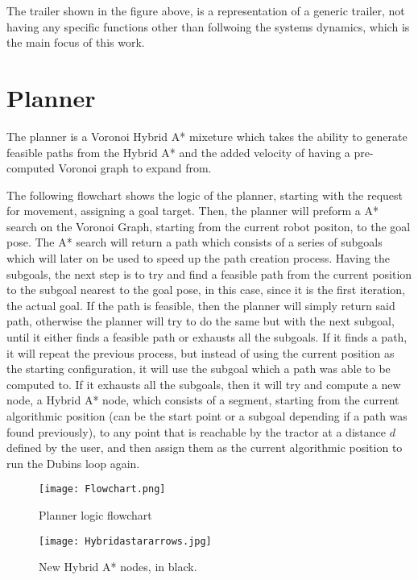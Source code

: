 The trailer shown in the figure above, is a representation of a generic trailer, not having any specific 
functions other than follwoing the systems dynamics, which is the main focus of this work.

\section{Planner}
\label{sec:planner1}
The planner is a Voronoi Hybrid A* mixeture which takes the 
ability to generate feasible paths from the Hybrid A* and the 
added velocity of having a pre-computed Voronoi graph to expand 
from.

The following flowchart shows the logic of the planner, starting with 
the request for movement, assigning a goal target. Then, the planner will 
preform a A* search on the Voronoi Graph, starting from the current robot 
positon, to the goal pose. The A* search will return a path which consists 
of a series of subgoals which will later on be used to speed up the 
path creation process. Having the subgoals, the next step is to try and 
find a feasible path from the current position to the subgoal nearest to 
the goal pose, in this case, since it is the first iteration, the actual goal. 
If the path is feasible, then the planner will simply return said path, otherwise
 the planner will try to do the same but with the next subgoal, until it either finds 
a feasible path or exhausts all the subgoals. If it finds a path, it will 
repeat the previous process, but instead of using the current position as the 
starting configuration, it will use the subgoal which a path was able to be 
computed to. If it exhausts all the subgoals, then it will try and compute a new node, 
a Hybrid A* node, which consists of a segment, starting from the current algorithmic position 
(can be the start point or a subgoal depending if a path was found previously), to any point 
that is reachable by the tractor at a distance $d$ defined by the user, and then assign them as the 
current algorithmic position to run the Dubins loop again.
\begin{figure}[h]
    \centering
    \texttt{[image: Flowchart.png]}
    \caption{Planner logic flowchart}
\end{figure}
\clearpage
\begin{figure}[h]
    \centering
    \texttt{[image: Hybridastararrows.jpg]}
    \caption{New Hybrid A* nodes, in black.}
\end{figure}

